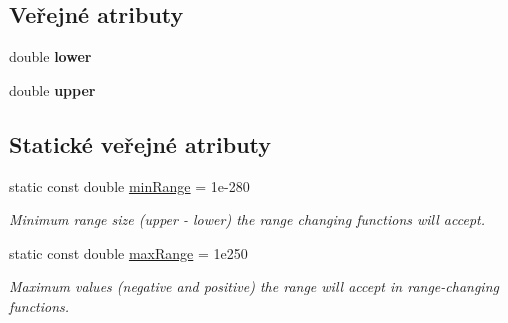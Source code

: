 \subsection*{Veřejné atributy}
\begin{DoxyCompactItemize}
\item 
\hypertarget{classQCPRange_aa3aca3edb14f7ca0c85d912647b91745}{}double {\bfseries lower}\label{classQCPRange_aa3aca3edb14f7ca0c85d912647b91745}

\item 
\hypertarget{classQCPRange_ae44eb3aafe1d0e2ed34b499b6d2e074f}{}double {\bfseries upper}\label{classQCPRange_ae44eb3aafe1d0e2ed34b499b6d2e074f}

\end{DoxyCompactItemize}
\subsection*{Statické veřejné atributy}
\begin{DoxyCompactItemize}
\item 
static const double \hyperlink{classQCPRange_ab46d3bc95030ee25efda41b89e2b616b}{min\+Range} = 1e-\/280
\begin{DoxyCompactList}\small\item\em Minimum range size ({\itshape upper} -\/ {\itshape lower}) the range changing functions will accept. \end{DoxyCompactList}\item 
static const double \hyperlink{classQCPRange_a5ca51e7a2dc5dc0d49527ab171fe1f4f}{max\+Range} = 1e250
\begin{DoxyCompactList}\small\item\em Maximum values (negative and positive) the range will accept in range-\/changing functions. \end{DoxyCompactList}\end{DoxyCompactItemize}
